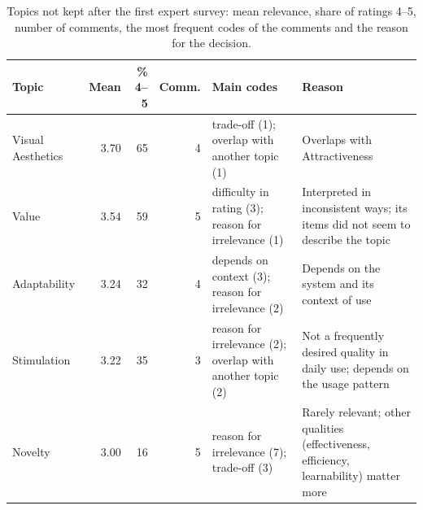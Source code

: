 \begin{table}[tbp]
\centering
\caption{Topics not kept after the first expert survey: mean relevance, share of ratings 4--5, number of comments, the most frequent codes of the comments and the reason for the decision.}
\label{tab:removed-topics}
\footnotesize
\begin{tabular}{lrrrp{4.2cm}p{6.4cm}}
\toprule
Topic & Mean & \% 4--5 & Comm. & Main codes & Reason \\
\midrule
Visual Aesthetics & 3.70 & 65 & 4 & trade-off (1); overlap with another topic (1) & Overlaps with Attractiveness \\
Value & 3.54 & 59 & 5 & difficulty in rating (3); reason for irrelevance (1) & Interpreted in inconsistent ways; its items did not seem to describe the topic \\
Adaptability & 3.24 & 32 & 4 & depends on context (3); reason for irrelevance (2) & Depends on the system and its context of use \\
Stimulation & 3.22 & 35 & 3 & reason for irrelevance (2); overlap with another topic (2) & Not a frequently desired quality in daily use; depends on the usage pattern \\
Novelty & 3.00 & 16 & 5 & reason for irrelevance (7); trade-off (3) & Rarely relevant; other qualities (effectiveness, efficiency, learnability) matter more \\
\bottomrule
\end{tabular}
\end{table}
